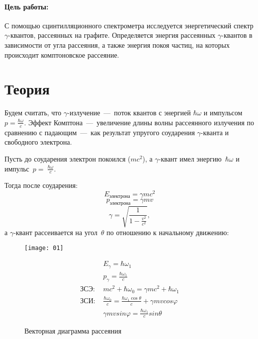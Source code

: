 \documentclass{physlab}
\begin{document}


\paragraph{Цель работы:} С помощью сцинтилляционного спектрометра исследуется энергетический спектр $\gamma$-квантов, рассеянных на графите. Определяется энергия рассеянных $\gamma$-квантов в зависимости от угла рассеяния, а также энергия покоя частиц, на которых происходит комптоновское рассеяние.

\section{Теория}
Будем считать, что $\gamma$-излучение~---~поток квантов с энергией $\hbar\omega$ и импульсом $p=\frac{\hbar\omega}{c}$. Эффект Комптона~---~увеличение длины волны рассеянного излучения по сравнению с падающим~---~как результат упругого соударения  $\gamma$-кванта и свободного электрона.
	
Пусть до соударения электрон покоился ($mc^2$), а  $\gamma$-квант имел энергию~$\hbar\omega$ и импульс~$p=~\frac{\hbar\omega}{c}$.

Тогда после соударения:
\[ E_\text{электрона}=\gamma mc^2 \]
\[ p_\text{электрона}=\gamma mv \]
\[ \gamma=\sqrt{\dfrac{1}{1-\frac{v^2}{c^2}}}, \]
а  $\gamma$-квант рассеивается на угол~$\theta$ по отношению к начальному движению:

\begin{figure}[H] 
\begin{minipage}[H]{0.48 \lw}
    \centering
    \texttt{[image: 01]}
    \caption{Векторная диаграмма рассеяния}
\end{minipage}
\hfill
\begin{minipage}[H]{0.48 \lw}
\begin{align}
    &E_\gamma = \hbar\omega_1 \\
    &p_\gamma = \frac{\hbar\omega_1}{c} \\
    \text{ЗСЭ: }& mc^2+\hbar \omega_0 = \gamma mc^2+\hbar \omega_1 \\
    \text{ЗСИ: }& \frac{\hbar\omega_0}{c} = \frac{\hbar\omega_1\cos\theta}{c}+\gamma mvcos\varphi \\
    &\gamma mvsin\varphi = \frac{\hbar\omega_1}{c}sin\theta
\end{align}     
\end{minipage}
\end{figure}
\end{document}
